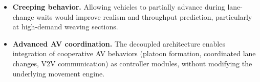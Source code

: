 \documentclass[review,authoryear]{elsarticle}
\begin{document}
\begin{itemize}
    \item \textbf{Creeping behavior.} Allowing vehicles to partially advance during lane-change waits would improve realism and throughput prediction, particularly at high-demand weaving sections.

    \item \textbf{Advanced AV coordination.} The decoupled architecture enables integration of cooperative AV behaviors (platoon formation, coordinated lane changes, V2V communication) as controller modules, without modifying the underlying movement engine.
\end{itemize}




\end{document}
